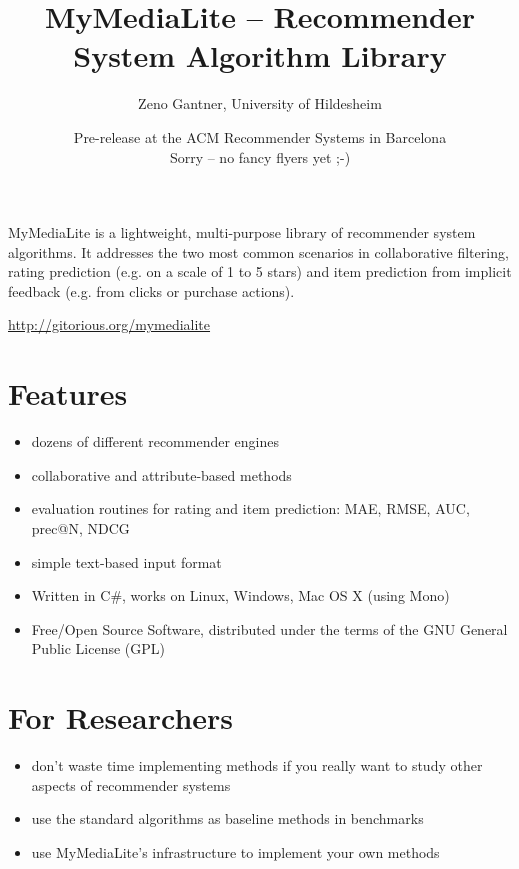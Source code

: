 \documentclass[a4paper, foldmark, 12pt]{leaflet}
\title{MyMediaLite -- Recommender System Algorithm Library}
\author{Zeno Gantner, University of Hildesheim}
\date{Pre-release at the ACM Recommender Systems in Barcelona\\
      Sorry -- no fancy flyers yet ;-)}
\begin{document}
\maketitle



MyMediaLite is a lightweight, multi-purpose library
of recommender system algorithms.
It addresses the two most common scenarios in collaborative filtering,
rating prediction (e.g. on a scale of 1 to 5 stars)
and item prediction from implicit feedback (e.g. from clicks or purchase actions).

\begin{center}
	\url{http://gitorious.org/mymedialite}
\end{center}

\newpage

\section{Features}

\begin{itemize}
	\item dozens of different recommender engines
	\item collaborative and attribute-based methods
	\item evaluation routines for rating and item prediction:
	      MAE, RMSE, AUC, prec@N, NDCG
	\item simple text-based input format
	\item Written in C\#, works on Linux, Windows, Mac OS X (using Mono)
	\item Free/Open Source Software, distributed under the terms of the
	      GNU General Public License (GPL)
\end{itemize}

\section{For Researchers}
\begin{itemize}
	\item don't waste time implementing methods if you really want to study
	      other aspects of recommender systems
	\item use the standard algorithms as baseline methods in benchmarks
	\item use MyMediaLite's infrastructure to implement your own methods
\end{itemize}
\end{document}
